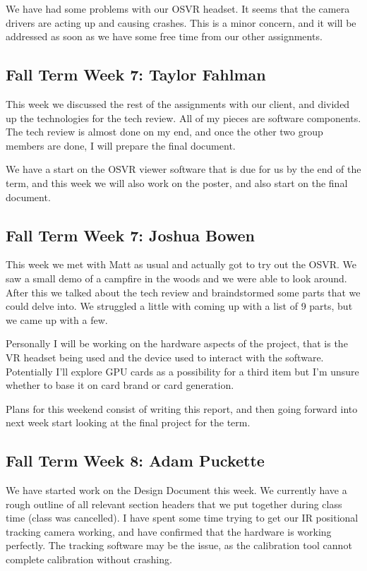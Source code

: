 \documentclass[draftclsnofoot,onecolumn]{IEEEtran}
\begin{document}
We have had some problems with our OSVR headset. It seems that the camera drivers are acting up and causing crashes. This is a minor concern, and it will be addressed as soon as we have some free time from our other assignments.

\subsection{Fall Term Week 7: Taylor Fahlman}

This week we discussed the rest of the assignments with our client, and divided up the technologies for the tech review. All of my pieces are software components. The tech review is almost done on my end, and once the other two group members are done, I will prepare the final document.

We have a start on the OSVR viewer software that is due for us by the end of the term, and this week we will also work on the poster, and also start on the final document.

\subsection{Fall Term Week 7: Joshua Bowen}

This week we met with Matt as usual and actually got to try out the OSVR. We saw a small demo of a campfire in the woods and we were able to look around. After this we talked about the tech review and braindstormed some parts that we could delve into. We struggled a little with coming up with a list of 9 parts, but we came up with a few.

Personally I will be working on the hardware aspects of the project, that is the VR headset being used and the device used to interact with the software. Potentially I'll explore GPU cards as a possibility for a third item but I'm unsure whether to base it on card brand or card generation.

Plans for this weekend consist of writing this report, and then going forward into next week start looking at the final project for the term.

\subsection{Fall Term Week 8: Adam Puckette}

We have started work on the Design Document this week. We currently have a rough outline of all relevant section headers that we put together during class time (class was cancelled). I have spent some time trying to get our IR positional tracking camera working, and have confirmed that the hardware is working perfectly. The tracking software may be the issue, as the calibration tool cannot complete calibration without crashing.
\end{document}
